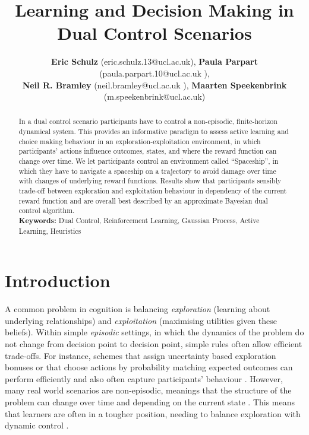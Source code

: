 \documentclass[10pt,letterpaper]{article}
\title{Learning and Decision Making in Dual Control Scenarios}
\author{\textbf{Eric Schulz} (eric.schulz.13@ucl.ac.uk), \textbf{Paula Parpart} (paula.parpart.10@ucl.ac.uk ),\\ \textbf{Neil R. Bramley} (neil.bramley@ucl.ac.uk ), \textbf{Maarten Speekenbrink} (m.speekenbrink@ucl.ac.uk)}
\begin{document}
\maketitle


\begin{abstract}
In a dual control scenario participants have to control a non-episodic, finite-horizon dynamical system. This provides an informative paradigm to assess active learning and choice making behaviour in an exploration-exploitation environment, in which participants' actions influence outcomes, states, and where the reward function can change over time. We let participants control an environment called ``Spaceship'',  in which they have to navigate a spaceship on a trajectory to avoid damage over time with changes of underlying reward functions. Results show that participants sensibly trade-off between exploration and exploitation behaviour in dependency of the current reward function and are overall best described by an approximate Bayesian dual control algorithm.\\
\textbf{Keywords:} 
Dual Control, Reinforcement Learning, Gaussian Process, Active Learning, Heuristics
\end{abstract}
\section{Introduction}
A common problem in cognition is balancing \emph{exploration} (learning about underlying relationships) and \emph{exploitation} (maximising utilities given these beliefs). Within simple \textit{episodic} settings, in which the dynamics of the problem do not change from decision point to decision point, simple rules often allow efficient trade-offs.  For instance, schemes that assign uncertainty based exploration bonuses \citep{srinivas2009gaussian} or that choose actions by probability matching expected outcomes \citep[e.g. Thompson sampling][]{agrawal2011analysis} can perform efficiently  and also often capture participants' behaviour \citep{schulzlearning, schulzexploration}.  However, many real world scenarios are non-episodic, meanings that the structure of the problem can change over time and depending on the current state .  This means that learners are often in a tougher position, needing to balance exploration with dynamic control \citep{osman2010controlling}.
\end{document}
